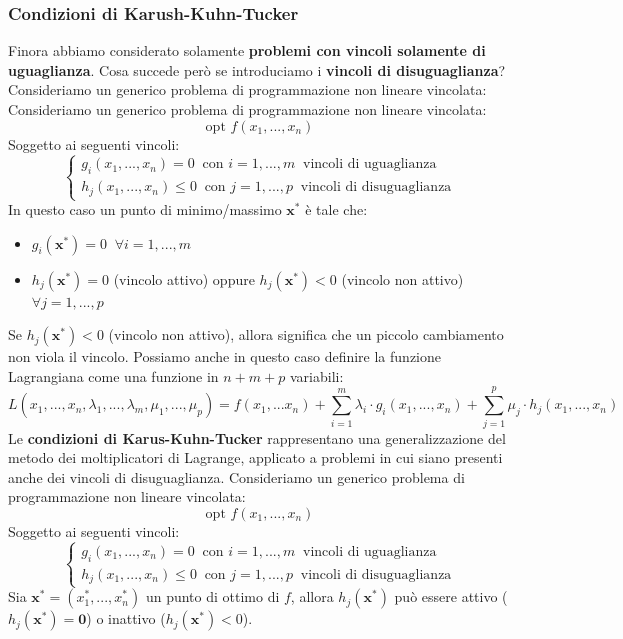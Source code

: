 \documentclass[12pt]{article}
\begin{document}
\subsubsection{Condizioni di Karush-Kuhn-Tucker}
Finora abbiamo considerato solamente \textbf{problemi con vincoli solamente di uguaglianza}. Cosa succede però se introduciamo i \textbf{vincoli di disuguaglianza}? Consideriamo
un generico problema di programmazione non lineare vincolata:
Consideriamo un generico problema di programmazione non lineare vincolata:
$$\textrm{opt } f(x_1,...,x_n)$$
Soggetto ai seguenti vincoli:
$$\begin{cases}
    g_i(x_1,...,x_n) = 0 \; \; \textrm{con } i = 1,...,m \; \;  \textrm{vincoli di uguaglianza} \\
    h_j(x_1,...,x_n) \leq 0 \; \;  \textrm{con } j = 1,...,p \; \;  \textrm{vincoli di disuguaglianza}
\end{cases}$$
In questo caso un punto di minimo/massimo $\boldsymbol{x}^*$ è tale che:
\begin{itemize}
    \item $g_i(\boldsymbol{x}^*) = 0 \; \; \forall i = 1,...,m$
    \item $h_j(\boldsymbol{x}^*) = 0$ (vincolo attivo) oppure $h_j(\boldsymbol{x}^*) < 0$ (vincolo non attivo) $\forall j = 1,...,p$
\end{itemize}
Se $h_j(\boldsymbol{x}^*) < 0$ (vincolo non attivo), allora significa che un piccolo cambiamento non viola il vincolo.
Possiamo anche in questo caso definire la funzione Lagrangiana come una funzione in $n+m+p$ variabili:
$$L(x_1,...,x_n,\lambda_1,...,\lambda_m,\mu_1,...,\mu_p) = f(x_1,...x_n) + \sum_{i=1}^{m} \lambda_i \cdot g_i(x_1,...,x_n) + \sum_{j=1}^{p}\mu_j\cdot h_j(x_1,...,x_n)$$
Le \textbf{condizioni di Karus-Kuhn-Tucker} rappresentano una generalizzazione del metodo dei moltiplicatori di Lagrange, applicato a problemi in cui siano presenti anche dei vincoli di disuguaglianza.
Consideriamo un generico problema di programmazione non lineare vincolata:
$$\textrm{opt } f(x_1,...,x_n)$$
Soggetto ai seguenti vincoli:
$$\begin{cases}
    g_i(x_1,...,x_n) = 0 \; \; \textrm{con } i = 1,...,m \; \;  \textrm{vincoli di uguaglianza} \\
    h_j(x_1,...,x_n) \leq 0 \; \;  \textrm{con } j = 1,...,p \; \;  \textrm{vincoli di disuguaglianza}
\end{cases}$$
Sia $\boldsymbol{x}^* = (x_1^*,...,x_n^*)$ un punto di ottimo di $f$, allora $h_j(\boldsymbol{x}^*)$ può essere attivo ($h_j(\boldsymbol{x^*}) = \boldsymbol{0}$) o inattivo ($h_j(\boldsymbol{x}^*) <0$).
\end{document}
